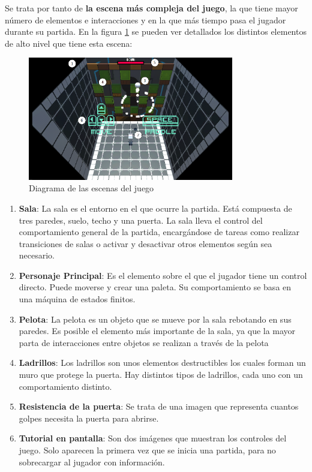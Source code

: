 Se trata por tanto de \textbf{la escena más compleja del juego}, la que tiene mayor número de elementos e interacciones y en la que más tiempo pasa el jugador durante su partida. En la figura \ref{juego_detalles} se pueden ver detallados los distintos elementos de alto nivel que tiene esta escena:

\begin{figure}[h]
	\includegraphics[width=0.8\textwidth]{images/estructura/escenas/juego_detalles}
	\centering
	\caption{Diagrama de las escenas del juego}
	\label{juego_detalles}
\end{figure}

\begin{enumerate}
\item\textbf{Sala}: La sala es el entorno en el que ocurre la partida. Está compuesta de tres paredes, suelo, techo y una puerta. La sala lleva el control del comportamiento general de la partida, encargándose de tareas como realizar transiciones de salas o activar y desactivar otros elementos según sea necesario.
\item\textbf{Personaje Principal}: Es el elemento sobre el que el jugador tiene un control directo. Puede moverse y crear una paleta. Su comportamiento se basa en una máquina de estados finitos.
\item\textbf{Pelota}: La pelota es un objeto que se mueve por la sala rebotando en sus paredes. Es posible el elemento más importante de la sala, ya que la mayor parta de interacciones entre objetos se realizan a través de la pelota
\item\textbf{Ladrillos}: Los ladrillos son unos elementos destructibles los cuales forman un muro que protege la puerta. Hay distintos tipos de ladrillos, cada uno con un comportamiento distinto.
\item\textbf{Resistencia de la puerta}: Se trata de una imagen que representa cuantos golpes necesita la puerta para abrirse.
\item\textbf{Tutorial en pantalla}: Son dos imágenes que muestran los controles del juego. Solo aparecen la primera vez que se inicia una partida, para no sobrecargar al jugador con información.
\end{enumerate}

